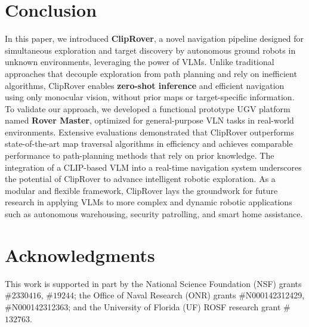 \section{Conclusion}
In this paper, we introduced \textbf{ClipRover}, a novel navigation pipeline designed for simultaneous {exploration} and {target discovery} by autonomous ground robots in unknown environments, leveraging the power of VLMs. Unlike traditional approaches that decouple exploration from path planning and rely on inefficient algorithms, ClipRover enables \textbf{zero-shot inference} and efficient navigation using only monocular vision, without prior maps or target-specific information. To validate our approach, we developed a functional prototype UGV platform named \textbf{Rover Master}, optimized for general-purpose VLN tasks in real-world environments. Extensive evaluations demonstrated that ClipRover outperforms state-of-the-art map traversal algorithms in efficiency and achieves comparable performance to path-planning methods that rely on prior knowledge. The integration of a CLIP-based VLM into a real-time navigation system underscores the potential of ClipRover to advance intelligent robotic exploration. As a modular and flexible framework, ClipRover lays the groundwork for future research in applying VLMs to more complex and dynamic robotic applications such as autonomous warehousing, security patrolling, and smart home assistance.



\section*{Acknowledgments}
This work is supported in part by the National Science Foundation (NSF) grants \#$2330416$, \#$19244$; the Office of Naval Research (ONR) grants \#N000142312429, \#N000142312363; and the University of Florida (UF) ROSF research grant \#$132763$.

